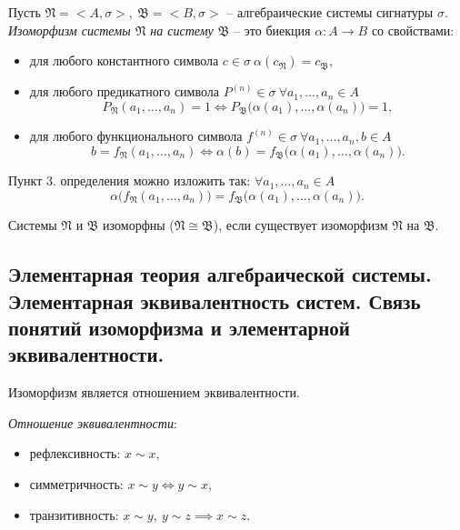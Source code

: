 \begin{definition}
    Пусть $ \mathfrak{N} = <A,\sigma>, \ \mathfrak{B} = <B,\sigma> $ -- алгебраические системы сигнатуры $ \sigma $. \emph{Изоморфизм системы $ \mathfrak{N} $ на систему $ \mathfrak{B} $} -- это биекция $ \alpha: A \rightarrow B $ со свойствами:
    \begin{itemize}
        \item для любого константного символа $ c \in \sigma \ \alpha(c_\mathfrak{N}) = c_\mathfrak{B} $,
        \item для любого предикатного символа $ P^{(n)}\in\sigma \ \forall a_1,\ldots,a_n \in A $
              \[
                  P_\mathfrak{N}(a_1,\ldots,a_n) = 1 \iff P_\mathfrak{B}\big(\alpha(a_1),\ldots,\alpha(a_n)\big) = 1,
              \]
        \item для любого функционального символа $ f^{(n)} \in \sigma \ \forall a_1,\ldots,a_n,b \in A $
              \[
                  b = f_\mathfrak{N}(a_1,\ldots,a_n) \iff \alpha(b) = f_\mathfrak{B}\big(\alpha(a_1),\ldots,\alpha(a_n)\big).
              \]
    \end{itemize}
\end{definition}

\begin{remark}
    Пункт 3. определения можно изложить так: $ \forall a_1,\ldots,a_n \in A $
    \[
        \alpha\big(f_\mathfrak{N}(a_1,\ldots,a_n)\big) = f_\mathfrak{B}\big(\alpha(a_1),\ldots,\alpha(a_n)\big).
    \]

    Системы $ \mathfrak{N} $ и $ \mathfrak{B} $ изоморфны ($ \mathfrak{N} \cong \mathfrak{B} $), если существует изоморфизм $ \mathfrak{N} $ на $ \mathfrak{B} $.
\end{remark}

\subsection{Элементарная теория алгебраической системы. Элементарная эквивалентность систем. Связь понятий изоморфизма и элементарной эквивалентности.}

\begin{note}
    Изоморфизм является отношением эквивалентности.

    \emph{Отношение эквивалентности}:
    \begin{itemize}
        \item рефлексивность: $ x \sim x $,
        \item симметричность: $ x \sim y \iff y \sim x $,
        \item транзитивность: $ x \sim y, \ y \sim z \implies x \sim z $.
    \end{itemize}
\end{note}

